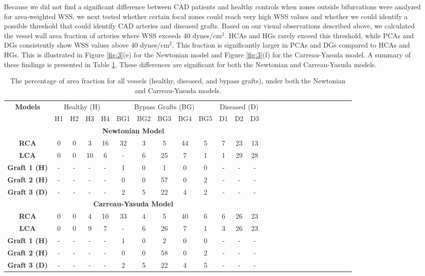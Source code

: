 ﻿\documentclass[12pt,a4paper]{article}
\theoremstyle{definition}
\numberwithin{equation}{section}
\begin{document}
Because we did not find a significant difference between CAD patients and healthy controls when zones outside bifurcations were analyzed for area-weighted WSS, we next tested whether certain focal zones could reach very high WSS values and whether we could identify a possible threshold that could identify CAD arteries and diseased grafts. Based on our visual observations described above, we calculated the vessel wall area fraction of arteries where WSS exceeds 40 dynes/cm$^2$. HCAs and HGs rarely exceed this threshold, while PCAs and DGs consistently show WSS values above 40 dynes/cm$^2$. This fraction is significantly larger in PCAs and DGs compared to HCAs and HGs. This is illustrated in Figure \ref{fig:3}(e) for the Newtonian model and Figure \ref{fig:3}(f) for the Carreau-Yasuda model. A summary of these findings is presented in Table \ref{tab:d}. These differences are significant for both the Newtonian and Carreau-Yasuda models.


\begin{table}[h!]
\centering
    \setlength{\tabcolsep}{6.5pt}
    \renewcommand{\arraystretch}{0.9}
    \caption{The percentage of area fraction for all vessels (healthy, diseased, and bypass grafts), under both the Newtonian and Carreau-Yasuda models.}
    \begin{tabular}{|c|c|c|c|c|c|c|c|c|c|c|c|c|c|c|c|c|c|c|c|c|c|c|c|c|c|} 
    \hline 
    \multirow{2}{*}{\textbf{Models}} & \multicolumn{4}{c|}{Healthy (H)} & \multicolumn{5}{c|}{Bypass Grafts (BG)} &\multicolumn{3}{c|}{Diseased (D)} \\ \cline{2-13} & H1 & H2 & H3 & H4 & BG1 & BG2 & BG3 & BG4 & BG5 & D1 & D2 & D3 \\ \hline
 \multicolumn{13}{|c|}{\textbf{Newtonian Model}}\\ \hline  \textbf{RCA}& 0 & 0 & 3 & 16& 32 & 3 & 5 & 44 & 5 &7 & 23 &13  \\ \hline  
 \textbf{LCA}& 0 & 0 & 10 & 6& - &6 & 25 & 7 & 1 & 1&29& 28  \\ \hline 
   \textbf{Graft 1 (H)}& - & - & - & -& 1 & 0 & 1 & 0 & 0 & - &-& -  \\ \hline 
   \textbf{Graft 2 (H)}& - & - & - & -& 0 & 0 & 57 & 0 & 2 & - &-& - \\ \hline 
   \textbf{Graft 3 (D)}& - & - & - & -& 2 & 5 & 22 & 4 & 2 & - &-& - \\ \hline
    \multicolumn{13}{|c|}{\textbf{Carreau-Yasuda Model}}\\ \hline  \textbf{RCA}& 0 & 0 & 4 & 10& 33 & 4 & 5 & 40 & 6 &6 & 26 &23  \\ \hline 
    \textbf{LCA}& 0 & 0 & 9 & 7& - &6 & 26 & 7 & 1 & 3&26& 23  \\ \hline 
   \textbf{Graft 1 (H)}& - & - & - & -& 1 & 0 & 2 & 0 & 0 & - &-& -  \\ \hline 
   \textbf{Graft 2 (H)}& - & - & - & -& 0 & 0 & 58 & 0 & 2 & - &-& - \\ \hline 
   \textbf{Graft 3 (D)}& - & - & - & -& 2 & 5 & 22 & 4 & 5 & - &-& - \\ \hline
    \end{tabular}
    \label{tab:d}
\end{table}
\end{document}
